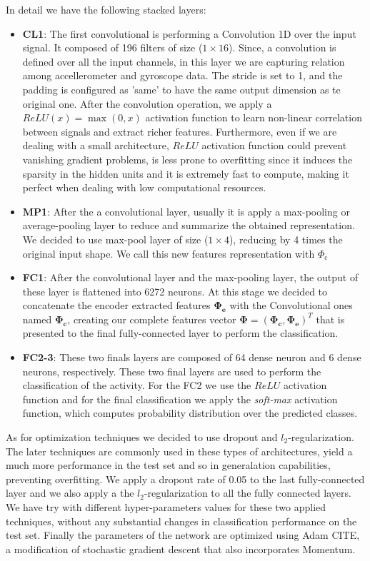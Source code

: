 In detail we have the following stacked layers:
\begin{itemize}
	\item \textbf{CL1}: The first convolutional is performing a Convolution 1D over the input signal. It composed of 196 filters of size ($1\times16$). Since, a convolution is defined over all the input channels, in this layer we are capturing relation among accellerometer and gyroscope data. The stride is set to 1, and the padding is configured as 'same' to have the same output dimension as te original one. After the convolution operation, we apply a $ReLU(x)=\max(0,x)$ activation function to learn non-linear correlation between signals and extract richer features. Furthermore, even if we are dealing with a small architecture, $ReLU$ activation function could prevent vanishing gradient problems, is less prone to overfitting since it induces the sparsity in the hidden units and it is extremely fast to compute, making it perfect when dealing with low computational resources.
	\item \textbf{MP1}: After the a convolutional layer, usually it is apply a max-pooling or average-pooling layer to reduce and summarize the obtained representation. We decided to use max-pool layer of size ($1\times4$), reducing by 4 times the original input shape. We call this new features representation with $ \Phi_{\text{c}} $
	\item \textbf{FC1}: After the convolutional layer and the max-pooling layer, the output of these layer is flattened into 6272 neurons. At this stage we decided to concatenate the encoder extracted features $ \boldsymbol{\Phi_{\text{e}}} $ with the Convolutional ones named $\boldsymbol{\Phi_{\text{c}}}$, creating our complete features vector $\boldsymbol{\Phi} = (\boldsymbol{\Phi_{\text{c}}}, \boldsymbol{\Phi_{\text{e}}})^T$ that is presented to the final fully-connected layer to perform the classification. 
	\item \textbf{FC2-3}: These two finals layers are composed of 64 dense neuron and 6 dense neurons, respectively. These two final layers are used to perform the classification of the activity. For the FC2 we use the $ReLU$ activation function and for the final classification we apply the \textit{soft-max} activation function, which computes probability distribution over the predicted classes. 
\end{itemize}

As for optimization techniques we decided to use dropout and $l_2$-regularization. The later techniques are commonly used in these types of architectures, yield a much more performance in the test set and so in generalation capabilities, preventing overfitting. We apply a dropout rate of 0.05 to the last fully-connected layer and we also apply a the $l_2$-regularization to all the fully connected layers. We have try with different hyper-parameters values for these two applied techniques, without any substantial changes in classification performance on the test set. Finally the parameters of the network are optimized using Adam CITE, a modification of stochastic gradient descent that also incorporates Momentum. 


